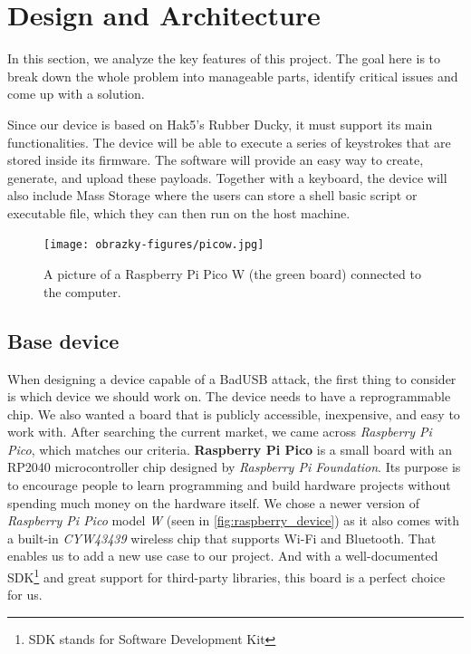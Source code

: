 
\chapter{Design and Architecture}
\label{ch:design_and_architecture}
In this section, we analyze the key features of this project. The goal here is to break down the whole problem into manageable parts, identify critical issues and come up with a solution.

Since our device is based on Hak5's Rubber Ducky, it must support its main functionalities. The device will be able to execute a series of keystrokes that are stored inside its firmware. The software will provide an easy way to create, generate, and upload these payloads. Together with a keyboard, the device will also include Mass Storage where the users can store a shell basic script or executable file, which they can then run on the host machine.

\begin{figure}[ht]
    \centering
    \texttt{[image: obrazky-figures/picow.jpg]}
    \caption{A picture of a Raspberry Pi Pico W (the green board) connected to the computer.}
    \label{fig:raspberry_device}
\end{figure}

\section{Base device}
\label{sec:design_base_device}
When designing a device capable of a BadUSB attack, the first thing to consider is which device we should work on. The device needs to have a reprogrammable chip. We also wanted a board that is publicly accessible, inexpensive, and easy to work with. After searching the current market, we came across \emph{Raspberry Pi Pico}, which matches our criteria. \textbf{Raspberry Pi Pico} is a small board with an RP2040 microcontroller chip designed by \emph{Raspberry Pi Foundation}. Its purpose is to encourage people to learn programming and build hardware projects without spending much money on the hardware itself. We chose a newer version of \emph{Raspberry Pi Pico} model \emph{W} (seen in \autoref{fig:raspberry_device}) as it also comes with a built-in \emph{CYW43439} wireless chip that supports Wi-Fi and Bluetooth. That enables us to add a new use case to our project. And with a well-documented SDK\footnote{SDK stands for Software Development Kit} and great support for third-party libraries, this board is a perfect choice for us.


